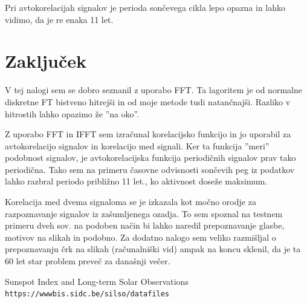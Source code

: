 \documentclass[a4paper, 12pt, slovene]{article}
\begin{document}
Pri avtokorelacijah signalov je perioda sončevega cikla lepo opazna in lahko vidimo, da je re enaka 11 let.
 

\section{Zaključek}
V tej nalogi sem se dobro seznanil z uporabo FFT. Ta lagoritem je od normalne diskretne FT bistveno hitrejši in od moje metode tudi natančnajši. Razliko v hitrostih lahko opazimo že ''na oko''. \par\vspace{5mm}

Z uporabo FFT in IFFT sem izračunal korelacijsko funkcijo in jo uporabil za avtokorelacijo signalov in korelacijo med signali.  Ker ta funkcija ''meri'' podobnost signalov, je avtokorelacijska funkcija periodičnih signalov prav tako periodična. Tako sem na primeru časovne odvisnosti sončevih peg iz podatkov lahko razbral periodo približno 11 let., ko aktivnost doseže maksimum. \par\vspace{5mm}

Korelacija med dvema signaloma se je izkazala kot močno orodje za razpoznavanje signalov iz zašumljenega ozadja. To sem spoznal na testnem primeru dveh sov. na podoben način bi lahko naredil prepoznavanje glasbe, motivov na slikah in podobno. Za dodatno nalogo sem veliko razmišljal o prepoznavanju črk na slikah (računalniški vid) ampak na koncu sklenil, da je ta 60 let star problem preveč za današnji večer.


\begin{thebibliography}{9}

Sunspot Index and Long-term Solar Observations
\\\texttt{https://wwwbis.sidc.be/silso/datafiles}

\end{thebibliography}
\end{document}
